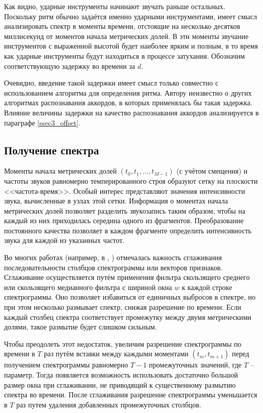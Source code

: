 Как видно, ударные инструменты начинают звучать раньше остальных. Поскольку ритм
обычно задаётся именно ударными инструментами, имеет смысл анализировать спектр
в моменты времени, отстоящие на несколько десятков миллисекунд от моментов
начала метрических долей. В эти моменты звучание инструментов с выраженной
высотой будет наиболее ярким и полным, в то время как ударные инструменты будут
находиться в процессе затухания. Обозначим соответствующую задержку во времени
за $d$.

Очевидно, введение такой задержки имеет смысл только совместно с использованием
алгоритма для определения ритма. Автору неизвестно о других алгоритмах
распознавания аккордов, в которых применялась бы такая задержка. Влияние
величины задержки на качество распознавания аккордов анализируется в параграфе
\ref{ssec3_offset}.

\subsection{Получение спектра} \label{ssect1_spectrum}

Моменты начала метрических долей $(t_0, t_1, \ldots, t_{M-1})$ (с учётом
смещения) и частоты звуков равномерно темперированного строя образуют сетку на
плоскости <<частота-время>>. Особый интерес представляют значения интенсивности
звука, вычисленные в узлах этой сетки. Информация о моментах начала метрических
долей позволяет разделить звукозапись таким образом, чтобы на каждый из них
приходилась середина одного из фрагментов. Преобразование постоянного качества
позволяет в каждом фрагменте определить интенсивность звука для каждой из
указанных частот.

Во многих работах (например, в \cite{Jiang2011}, \cite{Cho2011}) отмечалась
важность сглаживания последовательности столбцов спектрограммы или векторов
признаков. Сглаживание осуществляется путём применения фильтра скользящего
среднего или скользящего медианного фильтра с шириной окна $w$ к каждой строке
спектрограммы. Оно позволяет избавиться от единичных выбросов в спектре, но при
этом несколько размывает спектр, снижая разрешение по времени. Если каждый
столбец спектра соответствует промежутку между двумя метрическими долями, такое
размытие будет слишком сильным.

Чтобы преодолеть этот недостаток, увеличим разрешение спектрограммы по времени в
$T$ раз путём вставки между каждыми моментами $(t_m, t_{m+1})$ перед получением
спектрограммы равномерно $T-1$ промежуточных значений, где $T$ -- параметр.
Тогда появляется возможность использовать достаточно большой размер окна при
сглаживании, не приводящий к существенному размытию спектра во времени. После
сглаживания разрешение спектрограммы уменьшается в $T$ раз путем удаления
добавленных промежуточных столбцов.

